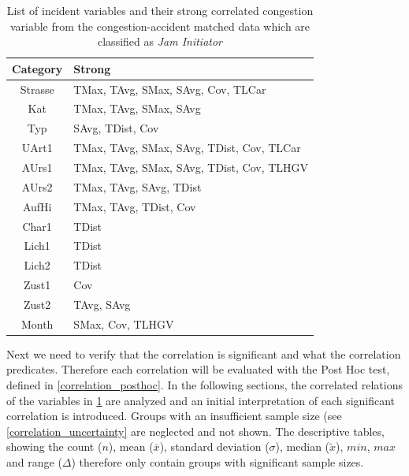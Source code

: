 \noindent
\begin{table}[ht]
	\centering
	\begin{tabular}{c|l}  
		\toprule
		\textbf{Category} & \textbf{Strong} \\
		\midrule
		Strasse & TMax, TAvg, SMax, SAvg, Cov, TLCar \\ 
 		Kat & TMax, TAvg, SMax, SAvg \\ %
 		Typ & SAvg, TDist, Cov \\  %
 		UArt1 & TMax, TAvg, SMax, SAvg, TDist, Cov, TLCar \\
 		AUrs1 & TMax, TAvg, SMax, SAvg, TDist, Cov, TLHGV \\ %
 		AUrs2 & TMax, TAvg, SAvg, TDist \\
 		AufHi & TMax, TAvg, TDist, Cov \\
 		Char1 & TDist \\ %
 		Lich1 & TDist \\
 		Lich2 & TDist \\ %
 		Zust1 & Cov \\
 		Zust2 & TAvg, SAvg \\ %
 		Month & SMax, Cov, TLHGV \\ %
 		\bottomrule
	\end{tabular}
	\caption{List of incident variables and their strong correlated congestion variable from the congestion-accident matched data which are classified as \textit{Jam Initiator}}
	\label{tbl:correlation_list_baysis_initiator}
\end{table}

Next we need to verify that the correlation is significant and what the correlation predicates. Therefore each correlation will be evaluated with the Post Hoc test, defined in \cref{correlation_posthoc}. In the following sections, the correlated relations of the variables in \cref{tbl:correlation_list_baysis_initiator} are analyzed and an initial interpretation of each significant correlation is introduced. Groups with an insufficient sample size (see \cref{correlation_uncertainty} are neglected and not shown. The descriptive tables, showing the count ($n$), mean ($\bar{x}$), standard deviation ($\sigma$), median ($\tilde{x}$), $min$, $max$ and range ($\Delta$) therefore only contain groups with significant sample sizes.

